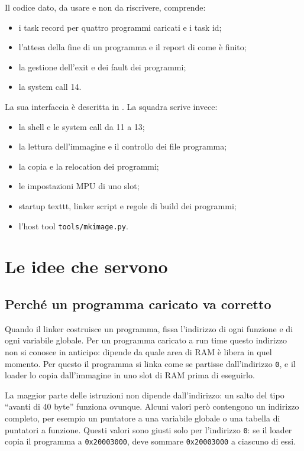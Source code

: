 Il codice dato, da usare e non da riscrivere, comprende:
\begin{itemize}
    \item i task record per quattro programmi caricati e i task id;
    \item l'attesa della fine di un programma e il report di come è finito;
    \item la gestione dell'exit e dei fault dei programmi;
    \item la system call 14.
\end{itemize}

La sua interfaccia è descritta in . La squadra scrive invece:
\begin{itemize}
    \item la shell e le system call da 11 a 13;
    \item la lettura dell'immagine e il controllo dei file programma;
    \item la copia e la relocation dei programmi;
    \item le impostazioni MPU di uno slot;
    \item startup texttt, linker script e regole di build dei programmi;
    \item l'host tool \texttt{tools/mkimage.py}.
\end{itemize}

\section{Le idee che servono}

\subsection{Perché un programma caricato va corretto}

Quando il linker costruisce un programma, fissa l'indirizzo di ogni funzione e di ogni variabile globale. Per un programma caricato a run time questo indirizzo non si conosce in anticipo: dipende da quale area di RAM è libera in quel momento. Per questo il programma si linka come se partisse dall'indirizzo \texttt{0}, e il loader lo copia dall'immagine in uno slot di RAM prima di eseguirlo.

La maggior parte delle istruzioni non dipende dall'indirizzo: un salto del tipo ``avanti di 40 byte'' funziona ovunque. Alcuni valori però contengono un indirizzo completo, per esempio un puntatore a una variabile globale o una tabella di puntatori a funzione. Questi valori sono giusti solo per l'indirizzo \texttt{0}: se il loader copia il programma a \texttt{0x20003000}, deve sommare \texttt{0x20003000} a ciascuno di essi.

